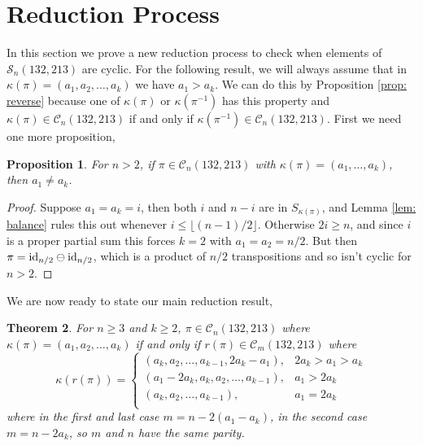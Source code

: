 \documentclass[11pt]{article}
\renewcommand\S{\mathcal S}
\newcommand\C{\mathcal C}
\newtheorem{theorem}{Theorem}[section]
\newtheorem{proposition}[theorem]{Proposition}
\theoremstyle{definition}
\begin{document}
\section{Reduction Process} \label{sec: reduction}

In this section we prove a new reduction process to check when elements of $\S_n(132,213)$ are cyclic. For the following result, we will always assume that in $\kappa(\pi) = (a_1,a_2,\dots,a_k)$ we have $a_1 > a_k$. We can do this by Proposition \ref{prop: reverse} because one of $\kappa(\pi)$ or $\kappa(\pi^{-1})$ has this property and $\kappa(\pi) \in \C_n(132,213)$ if and only if $\kappa(\pi^{-1}) \in \C_n(132,213)$. First we need one more proposition,

\begin{proposition} \label{prop: unequal-ends}
    For $n > 2$, if $\pi \in \C_n(132,213)$ with $\kappa(\pi) = (a_1,\dots,a_k)$, then $a_1 \not= a_k$.
\end{proposition} 

\begin{proof}
    Suppose $a_1 = a_k = i$, then both $i$ and $n-i$ are in $S_{\kappa(\pi)}$, and Lemma \ref{lem: balance} rules this out whenever $i \le \lfloor (n-1)/2 \rfloor$. Otherwise $2i \ge n$, and since $i$ is a proper partial sum this forces $k = 2$ with $a_1 = a_2 = n/2$. But then $\pi = {\rm id}_{n/2} \ominus {\rm id}_{n/2}$, which is a product of $n/2$ transpositions and so isn't cyclic for $n > 2$.
\end{proof}

We are now ready to state our main reduction result,

\begin{theorem} \label{thm: reduction}
    For $n \geq 3$ and $k \ge 2$, $\pi \in \C_{n}(132,213)$ where $\kappa(\pi) = (a_1,a_2,\dots,a_k)$ if and only if $r(\pi) \in \C_{m}(132,213)$ where 
    \[
    \kappa(r(\pi)) =
    \begin{cases}
        (a_k,a_2,\dots,a_{k-1},2a_k-a_1), & 2a_k > a_1 > a_k\\
        (a_1 - 2a_k, a_{k}, a_2,\dots,a_{k-1}), & a_1 > 2a_k\\
        (a_k,a_2,\dots,a_{k-1}), & a_1 = 2a_k\\
    \end{cases}
    \]
    where in the first and last case $m = n-2(a_1-a_k)$, in the second case $m = n-2a_k$, so $m$ and $n$ have the same parity.
\end{theorem}
\end{document}
